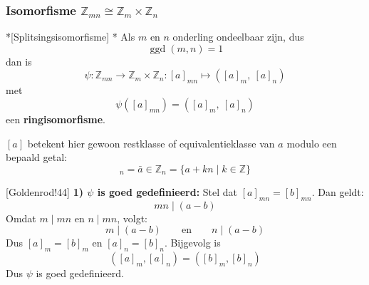 \subsubsection{Isomorfisme \texorpdfstring{$\mathbb{Z}_{mn} \cong \mathbb{Z}_m \times \mathbb{Z}_n$}{Zmn tgo Zm x Zn}}

\begin{nicetheorem}*[Splitsingsisomorfisme]
    \nextpart[]*
    Als $m$ en $n$ onderling ondeelbaar zijn, dus
    \begin{equation*}
        \operatorname{ggd}(m,n) = 1
    \end{equation*}
    dan is
    \begin{equation*}
        \psi : \mathbb{Z}_{mn} \to \mathbb{Z}_m \times \mathbb{Z}_n : [a]_{mn} \mapsto ([a]_m,\ [a]_n)
    \end{equation*}
    met 
    \begin{equation*}
        \psi([a]_{mn}) = ([a]_m,\ [a]_n)
    \end{equation*}
    een \textcolor{red!75!black}{\textbf{ringisomorfisme}}.    
\end{nicetheorem}

\textbf{} $[a]$ betekent hier gewoon restklasse of equivalentieklasse van $a$ modulo een bepaald getal:
\begin{equation*}
    [a]_n = \bar{a} \in \mathbb{Z}_n = \{a +kn \mid k \in \mathbb{Z}\}
\end{equation*}

\newpage
{}[Goldenrod!44]\newline
\textbf{1) $\psi$ is goed gedefinieerd:} Stel dat $[a]_{mn} = [b]_{mn}$. Dan geldt:
\begin{equation*}
    mn \mid (a-b)
\end{equation*}
Omdat $m \mid mn$ en $n \mid mn$, volgt:
\begin{equation*}
    m \mid (a-b) \qquad \text{en} \qquad n \mid (a-b)
\end{equation*}
Dus $[a]_m = [b]_m$ en $[a]_n = [b]_n$. Bijgevolg is
\begin{equation*}
    ([a]_m, [a]_n)=([b]_m, [b]_n)
\end{equation*}
Dus $\psi$ is goed gedefinieerd.

